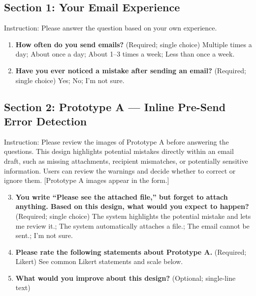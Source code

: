 \documentclass[letterpaper]{jdf}
\begin{document}
\subsection*{Section 1: Your Email Experience}
Instruction: Please answer the question based on your own experience.
\begin{enumerate}
\item \textbf{How often do you send emails?} (Required; single choice) Multiple times a day; About once a day; About 1--3 times a week; Less than once a week.
\item \textbf{Have you ever noticed a mistake after sending an email?} (Required; single choice) Yes; No; I'm not sure.
\end{enumerate}
\subsection*{Section 2: Prototype A --- Inline Pre-Send Error Detection}
Instruction: Please review the images of Prototype A before answering the questions. This design highlights potential mistakes directly within an email draft, such as missing attachments, recipient mismatches, or potentially sensitive information. Users can review the warnings and decide whether to correct or ignore them. [Prototype A images appear in the form.]
\begin{enumerate}\setcounter{enumi}{2}
\item \textbf{You write ``Please see the attached file,'' but forget to attach anything. Based on this design, what would you expect to happen?} (Required; single choice) The system highlights the potential mistake and lets me review it.; The system automatically attaches a file.; The email cannot be sent.; I'm not sure.
\item \textbf{Please rate the following statements about Prototype A.} (Required; Likert) See common Likert statements and scale below.
\item \textbf{What would you improve about this design?} (Optional; single-line text)
\end{enumerate}
\end{document}
